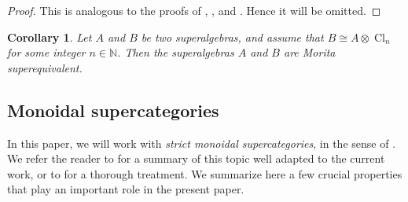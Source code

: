\documentclass[11pt]{amsart}
\newtheorem{cor}[theo]{Corollary}
\theoremstyle{definition}
\numberwithin{equation}{section}
\begin{document}
\begin{proof}
This is analogous to the proofs of \cite[Prop.~13.2.2]{Kleshchev}, \cite[Lem.~9.9]{Brundan-Kleshchev2}, and \cite[Thm.~3.4]{Brundan-Kleshchev}. Hence it will be omitted.
\end{proof}


\begin{cor} \label{baguette345}
Let \(A\) and \(B\) be two superalgebras, and assume that $ B \cong A \otimes \operatorname{Cl}_{n} $ for some integer $ n \in \mathbb{N} $. Then the superalgebras \(A\) and \(B\) are Morita superequivalent.
\end{cor}





\subsection{Monoidal supercategories}

In this paper, we will work with \emph{strict monoidal supercategories}, in the sense of \cite{Brundan-Ellis}. We refer the reader to \cite[§2]{Brundan-Savage-Webster2} for a summary of this topic well adapted to the current work, or to \cite{Brundan-Ellis} for a thorough treatment. We summarize here a few crucial properties that play an important role in the present paper.
\end{document}
